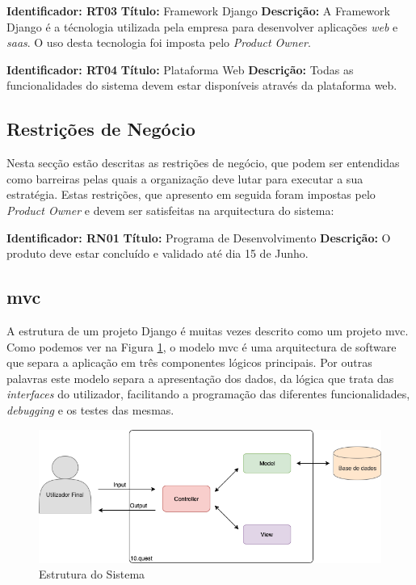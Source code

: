 \textbf{Identificador: RT03}
\newline
\textbf{Título:} Framework Django\cite{django}
\newline
\textbf{Descrição:} A Framework Django é a técnologia utilizada pela empresa para desenvolver aplicações \textit{web} e \textit{\acrshort{saas}}. O uso desta tecnologia foi imposta pelo \textit{Product Owner}.

\textbf{Identificador: RT04}
\newline
\textbf{Título:} Plataforma Web
\newline
\textbf{Descrição:} Todas as funcionalidades do sistema devem estar disponíveis através da plataforma web.

\subsection{Restrições de Negócio}
Nesta secção estão descritas as restrições de negócio, que podem ser entendidas como barreiras pelas quais a organização deve lutar para executar a sua estratégia. Estas restrições, que apresento em seguida foram impostas pelo \textit{Product Owner} e devem ser satisfeitas na arquitectura do sistema:

\textbf{Identificador: RN01}
\newline
\textbf{Título:} Programa de Desenvolvimento
\newline
\textbf{Descrição:} O produto deve estar concluído e validado até dia 15 de Junho.



\subsection{\acrfull{mvc}}

A estrutura de um projeto Django é muitas vezes descrito como um projeto \acrshort{mvc}. Como podemos ver na Figura \ref{fig:arq-mvc}, o modelo \acrshort{mvc} é uma arquitectura de software que separa a aplicação em três componentes lógicos principais. Por outras palavras este modelo separa a apresentação dos dados, da lógica que trata das \textit{interfaces} do utilizador, facilitando a programação das diferentes funcionalidades, \textit{debugging} e os testes das mesmas.

\begin{figure}[ht!]
	\begin{center}
		\includegraphics[width=1\textwidth]{img/arq/diagrama-MVC}
		\caption{Estrutura do Sistema}
		\label{fig:arq-mvc}
	\end{center}
\end{figure}

